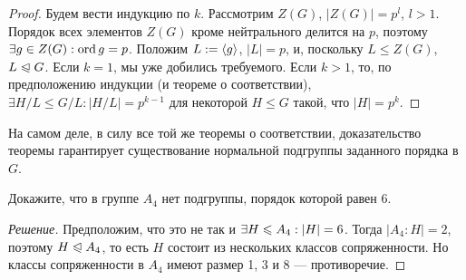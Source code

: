 \begin{proof}
	Будем вести индукцию по $k$. Рассмотрим $Z(G)$, $|Z(G)| = p^l$, $l > 1$. Порядок всех элементов $Z(G)$ кроме нейтрального делится на $p$, поэтому $\exists g \in Z(G): \operatorname{ord}{g} = p$. Положим $L := \langle g\rangle$, $|L| = p$, и, поскольку $L \le Z(G)$, $L \trianglelefteqslant G$. Если $k = 1$, мы уже добились требуемого. Если $k > 1$, то, по предположению индукции (и теореме о соответствии), $\exists H / L \le G / L: |H / L| = p^{k-1}$ для некоторой $H \le G$ такой, что $|H| = p^k$.
\end{proof}

\begin{note}
	На самом деле, в силу все той же теоремы о соответствии, доказательство теоремы гарантирует существование нормальной подгруппы заданного порядка в $G$.
\end{note}

\begin{exercise}
	Докажите, что в группе $A_4$ нет подгруппы, порядок которой равен 6.
\end{exercise}

\begin{proof}[Решение]
	Предположим, что это не так и $\exists H \le A_4: |H| \hm= 6$. Тогда $|A_4 : H| = 2$, поэтому $H \trianglelefteqslant A_4$, то есть $H$ состоит из нескольких классов сопряженности. Но классы сопряженности в $A_4$ имеют размер 1, 3 и 8 --- противоречие.
\end{proof}